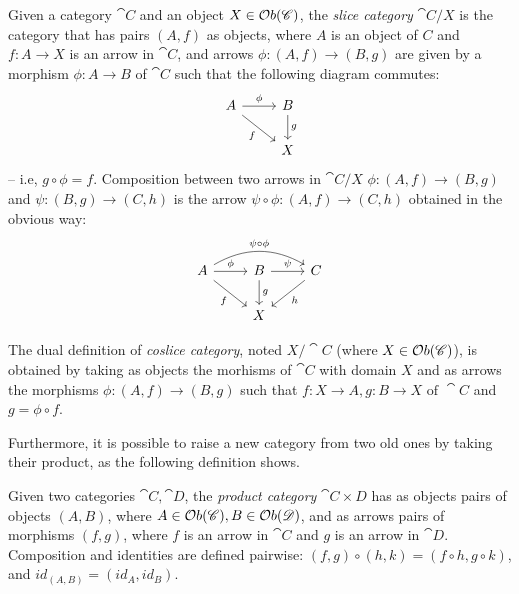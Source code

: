 \begin{definition}\label{def:slice_cat}
    Given a category $\cat{C}$ and an object $X \in \mathcal{O}b(\mathscr{C})$, the \emph{slice category} $\cat{C}/X$ is the category that has pairs $(A, f)$ as objects, where $A$ is an object of $C$ and $f: A \rightarrow X$ is an arrow in $\cat{C}$, and arrows $\phi: (A, f) \rightarrow (B, g)$ are given by a morphism $\phi: A \rightarrow B$ of $\cat{C}$ such that the following diagram commutes:
    \[
        \begin{tikzcd}
            A \arrow[r, "{\phi}"] \arrow[dr, "f" swap] & B \arrow[d, "g"] \\
            & X
        \end{tikzcd}
    \]
    -- i.e, $g \circ \phi = f$.
    Composition between two arrows in $\cat{C}/X$ $\phi: (A, f) \rightarrow (B, g)$ and $\psi: (B, g) \rightarrow (C, h)$ is the arrow $\psi \circ \phi : (A, f) \rightarrow (C, h)$ obtained in the obvious way:
    \[
        \begin{tikzcd}
            A \arrow[bend left=30]{rr}{\psi \circ \phi}  \arrow[r, "{\phi}"] \arrow[dr, "f" swap] & B \arrow[r, "{\psi}"] \arrow[d, "g"] & C \arrow[dl, "h"] \\
            & X & 
        \end{tikzcd}
    \]

    The dual definition of \emph{coslice category}, noted $X/\cat{C}$ (where $X \in \mathcal{O}b(\mathscr{C})$), is obtained by taking as objects the morhisms of $\cat{C}$ with domain $X$ and as arrows the morphisms $\phi: (A, f) \rightarrow (B, g)$ such that $f:X\rightarrow A, g:B \rightarrow X \text{ of }\cat{C}$ and $g = \phi \circ f$. 
\end{definition}

Furthermore, it is possible to raise a new category from two old ones by taking their product, as the following definition shows.

\begin{definition}
    Given two categories $\cat C, \cat D$, the \emph{product category} $\cat{C\times D}$ has as objects pairs of objects $(A, B)$, where $A \in \mathcal{O}b(\mathscr{C}), B \in \mathcal{O}b(\mathscr{D})$, and as arrows pairs of morphisms $(f, g)$, where $f$ is an arrow in $\cat C$ and $g$ is an arrow in $\cat D$. Composition and identities are defined pairwise: $(f, g) \circ (h, k) = (f \circ h, g \circ k)$, and $id_{(A, B)} = (id_A, id_B)$.
\end{definition}
\fi
